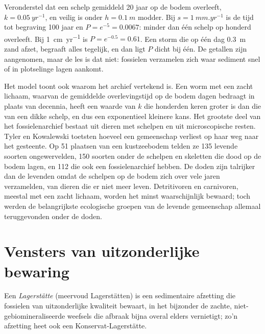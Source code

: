 \begin{example}\label{ex:b2:palaeoenvironments:shell}
Veronderstel dat een schelp gemiddeld 20 jaar op de bodem overleeft, $k = \qty{0.05}{yr^{-1}}$, en
veilig is onder $h = \qty{0.1}{m}$ modder. Bij $s = \qty{1}{mm.yr^{-1}}$ is de tijd tot begraving 100
jaar en $P = e^{-5} = 0.0067$: minder dan één schelp op honderd overleeft. Bij
\qty{1}{cm.yr^{-1}} is $P = e^{-0.5} = 0.61$. Een storm die op één dag \qty{0.3}{m} zand afzet,
begraaft alles tegelijk, en dan ligt $P$ dicht bij één. De getallen zijn aangenomen, maar de les
is dat niet: fossielen verzamelen zich waar sediment snel of in plotselinge lagen aankomt.
\end{example}

Het model toont ook waarom het archief vertekend is. Een worm met een zacht lichaam, waarvan de gemiddelde overlevingstijd op
de bodem dagen bedraagt in plaats van decennia, heeft een waarde van $k$ die honderden keren groter is dan die van een dikke
schelp, en dus een exponentieel kleinere kans. Het grootste deel van het fossielenarchief bestaat uit dieren
met schelpen en uit microscopische resten. Tyler en Kowalewski toetsten hoeveel een gemeenschap verliest op
haar weg naar het gesteente. Op 51 plaatsen van een kustzeebodem telden ze 135 levende soorten
ongewervelden, 150 soorten onder de schelpen en skeletten die dood op de bodem lagen, en 112 die
ook een fossielenarchief hebben. De doden zijn talrijker dan de levenden omdat de schelpen op de bodem zich
over vele jaren verzamelden, van dieren die er niet meer leven. Detritivoren en carnivoren, meestal
met een zacht lichaam, worden het minst waarschijnlijk bewaard; toch werden de belangrijkste ecologische groepen van de levende
gemeenschap allemaal teruggevonden onder de doden.

\section{Vensters van uitzonderlijke bewaring}\label{sec:b2:palaeoenvironments:lagerstatten}

\begin{definition}[Lagerstätte]\label{def:b2:palaeoenvironments:lagerstatte}
Een \emph{Lagerstätte} (meervoud Lagerstätten) is een sedimentaire afzetting die
fossielen van uitzonderlijke kwaliteit bewaart, in het bijzonder de zachte, niet-gebiomineraliseerde weefsels die
afbraak bijna overal elders vernietigt; zo'n afzetting heet ook een Konservat-Lagerstätte.
\end{definition}

